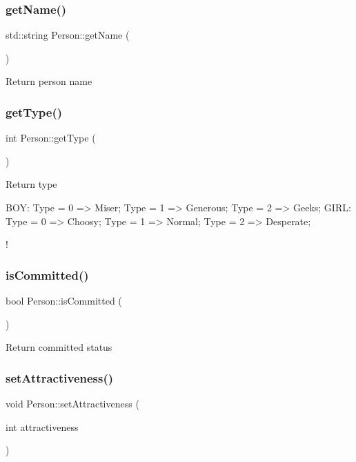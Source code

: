\subsubsection{\texorpdfstring{get\+Name()}{getName()}}
{\footnotesize\ttfamily std\+::string Person\+::get\+Name (\begin{DoxyParamCaption}{ }\end{DoxyParamCaption})}

Return person name \mbox{\label{class_person_a5c653289ac6e18bb1b588c688f39430a}} 
\subsubsection{\texorpdfstring{get\+Type()}{getType()}}
{\footnotesize\ttfamily int Person\+::get\+Type (\begin{DoxyParamCaption}{ }\end{DoxyParamCaption})}

Return type

\begin{DoxyVerb}BOY:
    Type = 0 => Miser;
    Type = 1 => Generous;
    Type = 2 => Geeks;
GIRL:
    Type = 0 => Choosy;
    Type = 1 => Normal;
    Type = 2 => Desperate;
\end{DoxyVerb}
 ! \mbox{\label{class_person_a05b6e810e9bbf95d5346a18082e9d799}} 
\subsubsection{\texorpdfstring{is\+Committed()}{isCommitted()}}
{\footnotesize\ttfamily bool Person\+::is\+Committed (\begin{DoxyParamCaption}{ }\end{DoxyParamCaption})}

Return committed status \mbox{\label{class_person_a26236ea8f9fbc4171df210edd6ccd2ea}} 
\subsubsection{\texorpdfstring{set\+Attractiveness()}{setAttractiveness()}}
{\footnotesize\ttfamily void Person\+::set\+Attractiveness (\begin{DoxyParamCaption}\item[{int}]{attractiveness }\end{DoxyParamCaption})}

